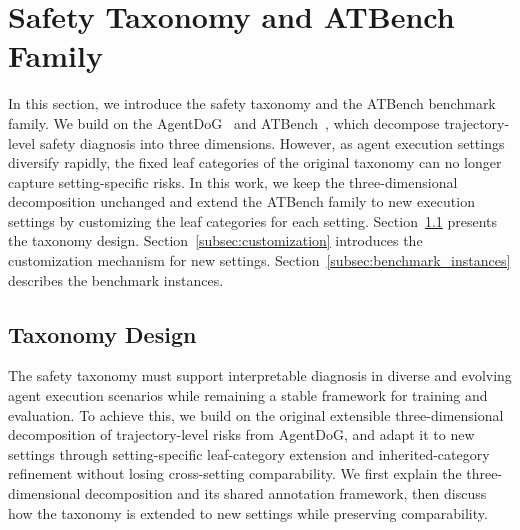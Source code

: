 \section{Safety Taxonomy and ATBench Family}
\label{sec:safety_taxonmy}
\label{sec:benchmark}


In this section, we introduce the safety taxonomy and the ATBench benchmark family.
We build on the AgentDoG~\citep{liu2026agentdogdiagnosticguardrailframework} and ATBench~\citep{li2026atbench}, which decompose trajectory-level safety diagnosis into three dimensions.
However, as agent execution settings diversify rapidly, the fixed leaf categories of the original taxonomy can no longer capture setting-specific risks. In this work, we keep the three-dimensional decomposition unchanged and extend the ATBench family to new execution settings by customizing the leaf categories for each setting.
Section~\ref{subsec:taxonomy_design} presents the taxonomy design. Section~\ref{subsec:customization} introduces the customization mechanism for new settings. Section~\ref{subsec:benchmark_instances} describes the benchmark instances.


\subsection{Taxonomy Design}
\label{subsec:taxonomy_design}

The safety taxonomy must support interpretable diagnosis in diverse and evolving agent execution scenarios while remaining a stable framework for training and evaluation.
To achieve this, we build on the original extensible three-dimensional decomposition of trajectory-level risks from AgentDoG, and adapt it to new settings through setting-specific leaf-category extension and inherited-category refinement without losing cross-setting comparability.
We first explain the three-dimensional decomposition and its shared annotation framework, then discuss how the taxonomy is extended to new settings while preserving comparability.

